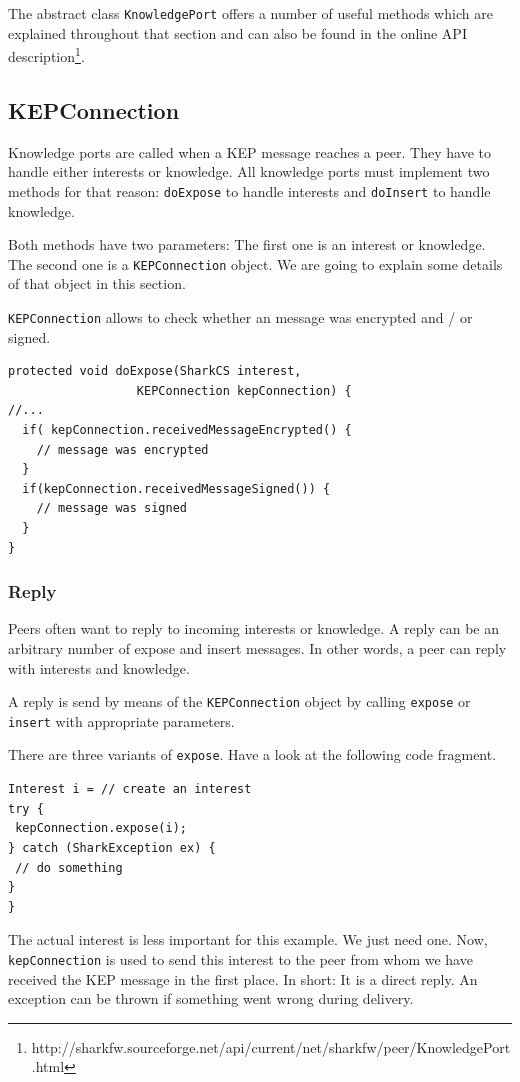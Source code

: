 The abstract class {\tt KnowledgePort} offers a number of useful methods which are explained throughout that section and can also be found in the online API description\footnote{http://sharkfw.sourceforge.net/api/current/net/sharkfw/peer/KnowledgePort.html}.

\subsection{KEPConnection}
Knowledge ports are called when a KEP message reaches a peer. They have to handle either interests or knowledge. All knowledge ports must implement two methods for that reason: {\tt doExpose} to handle interests and {\tt doInsert} to handle knowledge. 

Both methods have two parameters: The first one is an interest or knowledge. The second one is a {\tt KEPConnection} object. We are going to explain some details of that object in this section.

{\tt KEPConnection} allows to check whether an message was encrypted and / or signed.

\begin{verbatim}
protected void doExpose(SharkCS interest, 
                  KEPConnection kepConnection) {
//...
  if( kepConnection.receivedMessageEncrypted() {
    // message was encrypted
  }
  if(kepConnection.receivedMessageSigned()) {
    // message was signed
  }
}
\end{verbatim}

\subsubsection{Reply}
Peers often want to reply to incoming interests or knowledge. A reply can be an arbitrary number of expose and insert messages. In other words, a peer can reply with interests and knowledge. 

A reply is send by means of the {\tt KEPConnection} object by calling {\tt expose} or {\tt insert} with appropriate parameters.

There are three variants of {\tt expose}. Have a look at the following code fragment.

\begin{verbatim}
Interest i = // create an interest
try {
 kepConnection.expose(i);
} catch (SharkException ex) {
 // do something 
}
}
\end{verbatim}

The actual interest is less important for this example. We just need one. Now, {\tt kepConnection} is used to send this interest to the peer from whom we have received the KEP message in the first place. In short: It is a direct reply. An exception can be thrown if something went wrong during delivery.

